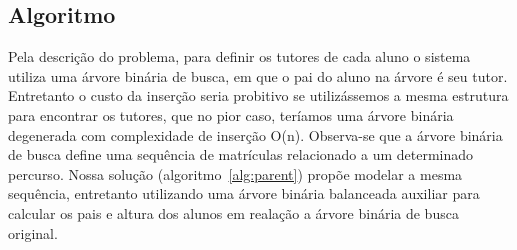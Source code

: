 \subsection{Algoritmo} \label{sec:algo}
Pela descrição do problema, para definir os tutores de cada aluno o sistema
utiliza uma árvore binária de busca, em que o pai do aluno na árvore é seu
tutor. Entretanto o custo da inserção seria probitivo se utilizássemos a mesma
estrutura para encontrar os tutores, que no pior caso, teríamos uma árvore
binária degenerada com complexidade de inserção O(n). Observa-se que a árvore binária de busca define uma sequência de matrículas
relacionado a um determinado percurso. Nossa solução
(algoritmo~\ref{alg:parent}) propõe modelar a mesma
sequência, entretanto utilizando uma árvore binária balanceada auxiliar
para calcular os pais e altura dos alunos em realação a árvore binária de busca
original.

